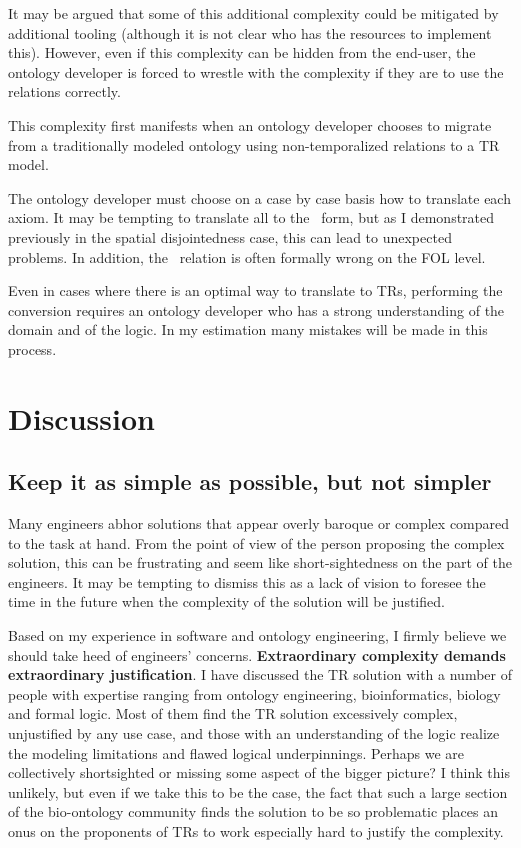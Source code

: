 \documentclass{bioinfo}
\def\atAllTimes{\pr{at-all-times}}
\begin{document}
It may be argued that some of this additional complexity could be
mitigated by additional tooling (although it is not clear who has the
resources to implement this). However, even if this complexity can be
hidden from the end-user, the ontology developer is forced to wrestle with
the complexity if they are to use the relations correctly.

This complexity first manifests when an ontology developer chooses to
migrate from a traditionally modeled ontology using non-temporalized
relations to a TR model.

The ontology developer must choose on a case by case basis how to
translate each axiom. It may be tempting to translate all to the
\atAllTimes\ form, but as I demonstrated previously in the spatial
disjointedness case, this can lead to unexpected problems. In
addition, the \atAllTimes\ relation is often formally wrong on the FOL
level.

Even in cases where there is an optimal way to translate to TRs,
performing the conversion requires an ontology developer who has a
strong understanding of the domain and of the logic. In my estimation
many mistakes will be made in this process.


\section{Discussion}

\subsection{Keep it as simple as possible, but not simpler}

Many engineers abhor solutions that appear overly baroque or complex
compared to the task at hand. From the point of view of the person
proposing the complex solution, this can be frustrating and seem like
short-sightedness on the part of the engineers. It may be tempting to
dismiss this as a lack of vision to foresee the time in the future
when the complexity of the solution will be justified.

Based on my experience in software and ontology engineering, I firmly
believe we should take heed of engineers'
concerns. \textbf{Extraordinary complexity demands extraordinary
  justification}.  I have discussed the TR solution with a number of
people with expertise ranging from ontology engineering,
bioinformatics, biology and formal logic. Most of them find the TR
solution excessively complex, unjustified by any use case, and those
with an understanding of the logic realize the modeling limitations
and flawed logical underpinnings. Perhaps we are collectively
shortsighted or missing some aspect of the bigger picture? I think
this unlikely, but even if we take this to be the case, the fact that
such a large section of the bio-ontology community finds the solution
to be so problematic places an onus on the proponents of TRs to work
especially hard to justify the complexity.
\end{document}
